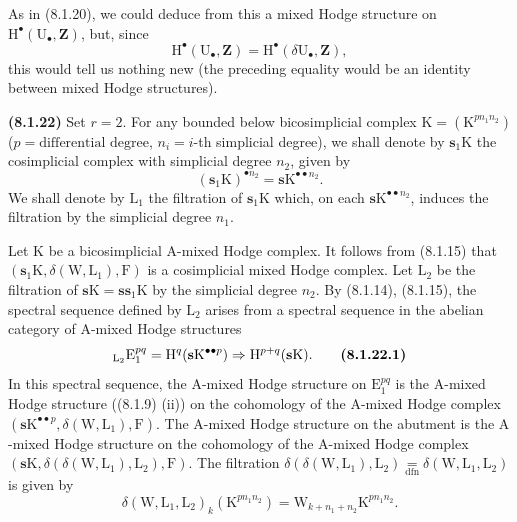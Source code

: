 \documentclass[11pt,leqno]{article}
\begin{document}
As in (8.1.20), we could deduce from this a mixed Hodge structure on \(\mathrm{H}^{\bullet}(\mathrm{U}_{\bullet},\mathbf{Z})\), but, since
\[
\mathrm{H}^{\bullet}(\mathrm{U}_{\bullet},\mathbf{Z})
=
\mathrm{H}^{\bullet}(\delta\mathrm{U}_{\bullet},\mathbf{Z}),
\]
this would tell us nothing new (the preceding equality would be an identity between mixed Hodge structures).

\textbf{(8.1.22)} Set \(r=2\). For any bounded below bicosimplicial complex \(\mathrm{K}=(\mathrm{K}^{p n_{1} n_{2}})\) (\(p=\text{differential degree}\), \(n_i=i\)-th simplicial degree), we shall denote by \(\mathbf{s}_{1}\mathrm{K}\) the cosimplicial complex with simplicial degree \(n_{2}\), given by
\[
(\mathbf{s}_{1}\mathrm{K})^{\bullet n_{2}}
=
\mathbf{s}\mathrm{K}^{\bullet\bullet n_{2}}.
\]
We shall denote by \(\mathrm{L}_{1}\) the filtration of \(\mathbf{s}_{1}\mathrm{K}\) which, on each \(\mathbf{s}\mathrm{K}^{\bullet\bullet n_{2}}\), induces the filtration by the simplicial degree \(n_{1}\).

Let \(\mathrm{K}\) be a bicosimplicial \(\mathrm{A}\)-mixed Hodge complex. It follows from (8.1.15) that \((\mathbf{s}_{1}\mathrm{K},\delta(\mathrm{W},\mathrm{L}_{1}),\mathrm{F})\) is a cosimplicial mixed Hodge complex. Let \(\mathrm{L}_{2}\) be the filtration of \(\mathbf{s}\mathrm{K}=\mathbf{s}\mathbf{s}_{1}\mathrm{K}\) by the simplicial degree \(n_{2}\). By (8.1.14), (8.1.15), the spectral sequence defined by \(\mathrm{L}_{2}\) arises from a spectral sequence in the abelian category of \(\mathrm{A}\)-mixed Hodge structures
\[
{}_{\mathrm{L}_{2}}\mathrm{E}_{1}^{pq}
=
\mathrm{H}^{q}(\mathbf{s}\mathrm{K}^{\bullet\bullet p})
\Rightarrow
\mathrm{H}^{p+q}(\mathbf{s}\mathrm{K}).
\tag*{\textbf{(8.1.22.1)}}
\]
In this spectral sequence, the \(\mathrm{A}\)-mixed Hodge structure on \(\mathrm{E}_{1}^{pq}\) is the \(\mathrm{A}\)-mixed Hodge structure ((8.1.9) (ii)) on the cohomology of the \(\mathrm{A}\)-mixed Hodge complex \((\mathbf{s}\mathrm{K}^{\bullet\bullet p},\delta(\mathrm{W},\mathrm{L}_{1}),\mathrm{F})\). The \(\mathrm{A}\)-mixed Hodge structure on the abutment is the \(\mathrm{A}\)-mixed Hodge structure on the cohomology of the \(\mathrm{A}\)-mixed Hodge complex \((\mathbf{s}\mathrm{K},\delta(\delta(\mathrm{W},\mathrm{L}_{1}),\mathrm{L}_{2}),\mathrm{F})\). The filtration \(\delta(\delta(\mathrm{W},\mathrm{L}_{1}),\mathrm{L}_{2})\underset{\mathrm{dfn}}{=}\delta(\mathrm{W},\mathrm{L}_{1},\mathrm{L}_{2})\) is given by
\[
\delta(\mathrm{W},\mathrm{L}_{1},\mathrm{L}_{2})_{k}
(\mathrm{K}^{p n_{1} n_{2}})
=
\mathrm{W}_{k+n_{1}+n_{2}}\mathrm{K}^{p n_{1} n_{2}}.
\]
\end{document}
